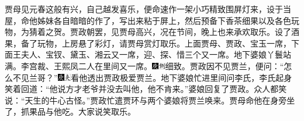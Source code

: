 贾母见元春这般有兴，自己越发喜乐，便命速作一架小巧精致围屏灯来，设于当屋，命他姊妹各自暗暗的作了，写出来粘于屏上，然后预备下香茶细果以及各色玩物，为猜着之贺。贾政朝罢，见贾母高兴，况在节间，晚上也来承欢取乐。设了酒果，备了玩物，上房悬了彩灯，请贾母赏灯取乐。上面贾母、贾政、宝玉一席，下面王夫人、宝钗、黛玉、湘云又一席，迎、探、惜三个又一席。地下婆娘丫鬟站满。李宫裁、王熙凤二人在里间又一席。{\includegraphics[width=3mm]{../Images/00004}\includegraphics[width=3mm]{../Images/00011}\footnotesize \kaishu 细致。}贾政因不见贾兰，便问：``怎么不见兰哥？''{\includegraphics[width=3mm]{../Images/00004}\includegraphics[width=3mm]{../Images/00012}\footnotesize \kaishu 看他透出贾政极爱贾兰。}地下婆娘忙进里间问李氏，李氏起身笑着回道：``他说方才老爷并没去叫他，他不肯来。''婆娘回复了贾政。众人都笑说：``天生的牛心古怪。''贾政忙遣贾环与两个婆娘将贾兰唤来。贾母命他在身旁坐了，抓果品与他吃。大家说笑取乐。

